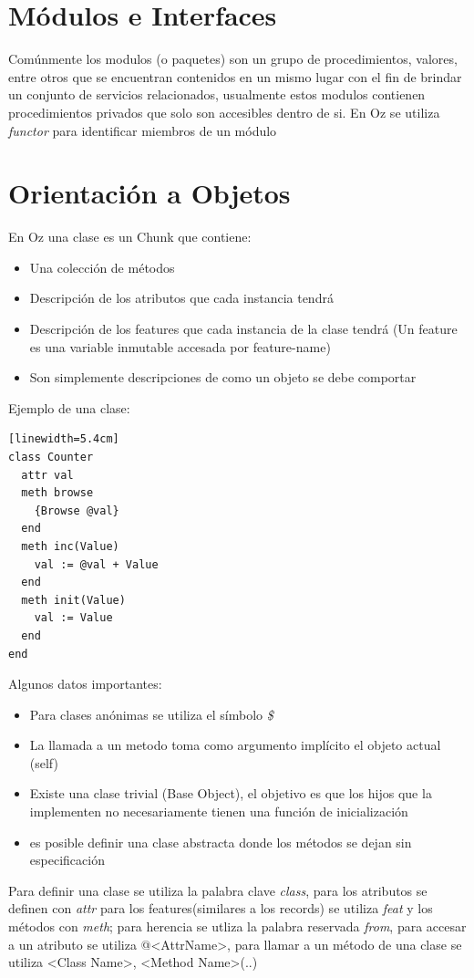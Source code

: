 \documentclass[10pt,journal,compsoc]{IEEEtran}
\begin{document}
\section{M\'odulos e Interfaces}
Com\'unmente los modulos (o paquetes) son un grupo de procedimientos, valores, entre otros que se encuentran contenidos en un mismo lugar con el fin de brindar un conjunto de servicios relacionados, usualmente estos modulos contienen procedimientos privados que solo son accesibles dentro de si. En Oz se utiliza \emph{functor} para identificar miembros de un m\'odulo

\section{Orientaci\'on a Objetos}
En Oz una clase es un Chunk que contiene:
\begin{itemize}
	\item Una colecci\'on de m\'etodos
	\item Descripci\'on de los atributos que cada instancia tendr\'a
	\item Descripci\'on de los features que cada instancia de la clase tendr\'a (Un feature es una variable inmutable accesada por feature-name)
	\item Son simplemente descripciones de como un objeto se debe comportar
\end{itemize}
Ejemplo de una clase:
\begin{lstlisting}[language=Oz, caption = {Variables en un scope}][linewidth=5.4cm]
class Counter 
  attr val
  meth browse 
    {Browse @val}
  end 
  meth inc(Value)
    val := @val + Value
  end 
  meth init(Value)
    val := Value
  end 
end
\end{lstlisting}
Algunos datos importantes:
\begin{itemize}
	\item Para clases an\'onimas se utiliza el s\'imbolo  \emph{\$}
	\item  La llamada a un metodo toma como argumento impl\'icito el objeto actual (self)
	\item Existe una clase trivial (Base Object), el objetivo es que los hijos que la implementen no necesariamente tienen una funci\'on de inicializaci\'on
	\item es posible definir una clase abstracta donde los m\'etodos se dejan sin especificaci\'on
\end{itemize}

Para definir una clase se utiliza la palabra clave \emph{class}, para los atributos se definen con \emph{attr} para los features(similares a los records) se utiliza \emph{feat} y los m\'etodos con \emph{meth}; para herencia se utliza la palabra reservada \emph{from}, para accesar a un atributo se utiliza @<AttrName>, para llamar a un m\'etodo de una clase se utiliza <Class Name>, <Method Name>(..)
\end{document}
